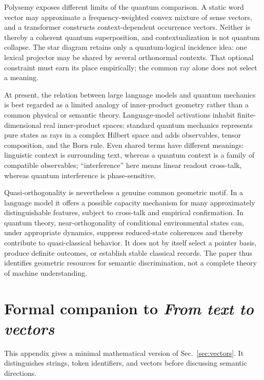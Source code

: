 \documentclass[
  aps,
  reprint,
  superscriptaddress,
  floatfix,
  nofootinbib,
  longbibliography
]{revtex4-2}
\begin{document}
Polysemy exposes different limits of the quantum comparison.  A static word
vector may approximate a frequency-weighted convex mixture of sense vectors,
and a transformer constructs context-dependent occurrence vectors.  Neither
is thereby a coherent quantum superposition, and contextualization is not
quantum collapse.
The star diagram retains only a quantum-logical incidence idea: one lexical
projector may be shared by several orthonormal contexts.  That optional
constraint must earn its place empirically; the common ray alone does not
select a meaning.

At present, the relation between large language models and quantum mechanics
is best regarded as a limited analogy of inner-product geometry rather than a
common physical or semantic theory.  Language-model activations inhabit
finite-dimensional real inner-product spaces; standard quantum mechanics
represents pure states as rays in a complex Hilbert space and adds observables,
tensor composition, and the Born rule.  Even shared terms have different
meanings: linguistic context is surrounding text, whereas a quantum context is
a family of compatible observables; ``interference'' here means linear readout
cross-talk, whereas quantum interference is phase-sensitive.

Quasi-orthogonality is nevertheless a genuine common geometric motif.  In a
language model it offers a possible capacity mechanism for many approximately
distinguishable features, subject to cross-talk and empirical confirmation.
In quantum theory, near-orthogonality of conditional environmental states can,
under appropriate dynamics, suppress reduced-state coherences and thereby
contribute to quasi-classical behavior.  It does not by itself select a pointer
basis, produce definite outcomes, or establish stable classical records.  The
paper thus identifies geometric resources for semantic discrimination, not a
complete theory of machine understanding.

\appendix

\section{Formal companion to \emph{From text to vectors}}
\label{app:vectors}

This appendix gives a minimal mathematical version of
Sec.~\ref{sec:vectors}.  It distinguishes strings, token identifiers, and
vectors before discussing semantic directions.
\end{document}
